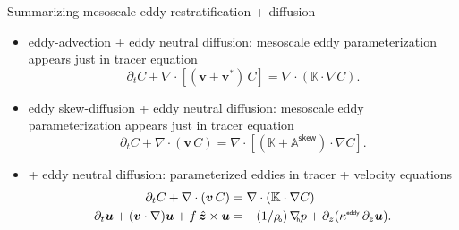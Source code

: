 \documentclass{beamer}
\newcommand{\rhoo}{\rho\mkern-2mu_{\mathsf{\scriptscriptstyle o}}}
\newcommand{\nablah}{\nabla\mkern-5mu_{\mathsf{\scriptscriptstyle h}}}
\begin{document}
\begin{frame}{Summarizing mesoscale eddy restratification + diffusion}

\begin{itemize}

\item[$\star$] \textcite{GM95} eddy-advection + eddy neutral diffusion: mesoscale eddy
  parameterization appears just in tracer equation
  \begin{equation}
    \partial_{t} C + \nabla \cdot [({\bm v} + {\bm v}^{*}) \, C] = \nabla \cdot (\mathbb{K} \cdot \nabla C).
  \end{equation}
  
\item[$\star$] \textcite{GriffiesSkew} eddy skew-diffusion + eddy neutral 
  diffusion: mesoscale eddy parameterization appears just in tracer
  equation
  \begin{equation}
    \partial_{t} C + \nabla \cdot ({\bm v} \, C) =
      \nabla \cdot [ (\mathbb{K} + \mathbb{A}^{\mathsf{\scriptscriptstyle skew}})  \cdot \nabla C].
  \end{equation}
  
\item[$\star$] \textcite{GreatbatchLamb1990} + eddy neutral diffusion:
  parameterized eddies in tracer + velocity equations
  \begin{subequations}
    \begin{align}
    \partial_{t} C + \nabla \cdot ({\bm v} \, C) &= \nabla \cdot (\mathbb{K} \cdot \nabla C)
      \\
      \partial_{t} {\bm u} + ({\bm v} \cdot \nabla) {\bm u}
      + f \, \hat{\bm z} \times {\bm u} &=
      -(1/\rhoo) \, \nablah p + \partial_{z}(\kappa^{\mathsf{\scriptscriptstyle eddy}} \, \partial_{z}{\bm u}).
    \end{align}
  \end{subequations}
  
\end{itemize}

\end{frame}
\end{document}

